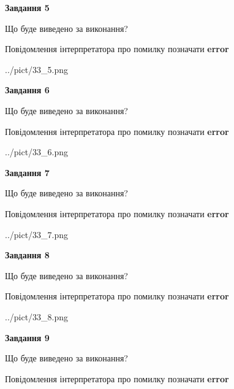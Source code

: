 \documentclass[11pt, ukrainian]{article}
\begin{document}
{\begin {large}
{\begin {center}\textbf{Завдання 5}\end {center}}\par
Що буде виведено за виконання? \par
Повідомлення інтерпретатора про помилку позначати \textbf{error}

\begin{center}
	{../pict/33_5.png}
\end{center}
\newpage

{\begin {center}\textbf{Завдання 6}\end {center}}\par
Що буде виведено за виконання? \par
Повідомлення інтерпретатора про помилку позначати \textbf{error}

\begin{center}
	{../pict/33_6.png}
\end{center}
\newpage

{\begin {center}\textbf{Завдання 7}\end {center}}\par
Що буде виведено за виконання? \par
Повідомлення інтерпретатора про помилку позначати \textbf{error}

\begin{center}
	{../pict/33_7.png}
\end{center}
\newpage

{\begin {center}\textbf{Завдання 8}\end {center}}\par
Що буде виведено за виконання? \par
Повідомлення інтерпретатора про помилку позначати \textbf{error}

\begin{center}
	{../pict/33_8.png}
\end{center}
\newpage

{\begin {center}\textbf{Завдання 9}\end {center}}\par
Що буде виведено за виконання? \par
Повідомлення інтерпретатора про помилку позначати \textbf{error}


\end{large}}
\end{document}
